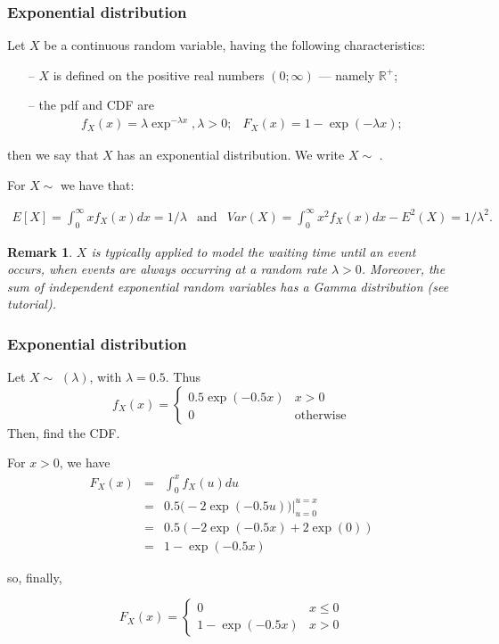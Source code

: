 \documentclass[notes=show,smaller,handout]{beamer}\usepackage[]{graphicx}\usepackage[]{color}
\newtheorem{remark}{Remark}[section]
\newcommand{\bea}{\begin{eqnarray}}
\newcommand{\eea}{\end{eqnarray}}
\newcommand{\nn}{\nonumber}
\begin{document}
\begin{frame}
\frametitle{Exponential distribution}


\begin{definition}
Let $X$ be a  continuous random variable, having the following  characteristics:
\begin{itemize}
\item[--]       $X$ is defined on the positive real numbers $\left( 0;\infty \right) $ --- namely $\mathbb{R}^+$;
\item[--]       the pdf and CDF are
\bea
f_X(x)=\lambda \exp^{ -\lambda x},\lambda
>0; &
F_X(x)=1-\exp (-\lambda x); \nn \eea
\end{itemize}
then we say that $X$ has an exponential distribution. We write $X\sim$ .
\end{definition}

For $X\sim$  we have that:
\begin{small}
\bea
E[X]=\int_{0}^{\infty }xf_X(x )dx= 1/\lambda & \text{and} &   Var(X)=\int_{0}^{\infty }x^{2}f_X(x )dx-E^{2}(X)=1/\lambda ^{2}. \nn
\eea
\end{small}

\begin{remark}
$X$ is typically applied to model the waiting time until an event occurs, when events are always occurring at a random rate $\lambda >0$. Moreover, the sum of independent exponential random variables has a Gamma distribution (see tutorial).
\end{remark}
\end{frame}%


\begin{frame}
\frametitle{Exponential distribution}
\begin{small}
\begin{example}
Let $X\sim$ $(\lambda)$, with $\lambda =0.5$. Thus
$$f_X(x) = \left\{ \begin{array}{ll}
0.5 \exp (-0.5x) & x>0\\
0 & \text{otherwise}
\end{array} \right.$$
Then, find the CDF.
%
\vspace{0.1cm}

For $x>0$, we have
\begin{eqnarray*}
F_{X}(x) & = & \int_{0}^{x}f_{X}(u)du\\
& = & 0.5\Big( -2\exp (-0.5u)\Big) \bigl|_{u=0}^{u=x}\\
& = & 0.5(-2\exp (-0.5x)+2\exp (0))\\
& = & 1-\exp (-0.5x)
\end{eqnarray*}

so, finally,

$$F_X(x) = \left\{ \begin{array}{ll}
0 & x \leq 0 \\
1-\exp (-0.5x)& x>0
\end{array} \right.$$
\end{example}
\end{small}
\end{frame}%
\end{document}
